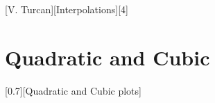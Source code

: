 \documentclass{article}
\begin{document}
	[V. Turcan][Interpolations][4]

	\section{Quadratic and Cubic}
		[0.7][Quadratic and Cubic plots]
\end{document}
